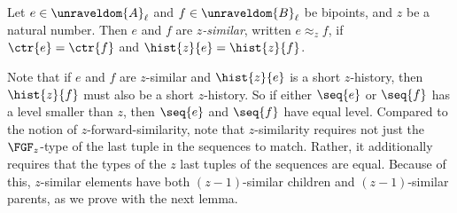 \begin{definition}
 Let $e \in \unraveldom{A}_{\ell}$ and $f \in \unraveldom{B}_{\ell}$ be bipoints, and $z$ be a natural number. Then $e$ and $f$ are \emph{$z$-similar}, written $e \approx_{z} f$, if $\ctr{e} = \ctr{f}$ and $\hist{z}{e} = \hist{z}{f}$.
\end{definition}
Note that if $e$ and $f$ are $z$-similar and $\hist{z}{e}$ is a short $z$-history, then $\hist{z}{f}$ must also be a short $z$-history.
So if either $\seq{e}$ or $\seq{f}$ has a level smaller than $z$, then $\seq{e}$ and $\seq{f}$ have equal level.
Compared to the notion of $z$-forward-similarity, note that $z$-similarity requires not just the $\FGF_{z}$-type of the last tuple in the sequences to match.
Rather, it additionally requires that the types of the $z$ last tuples of the sequences are equal.
Because of this, $z$-similar elements have both $(z{-}1)$-similar children and $(z{-}1)$-similar parents, as we prove with the next lemma.


